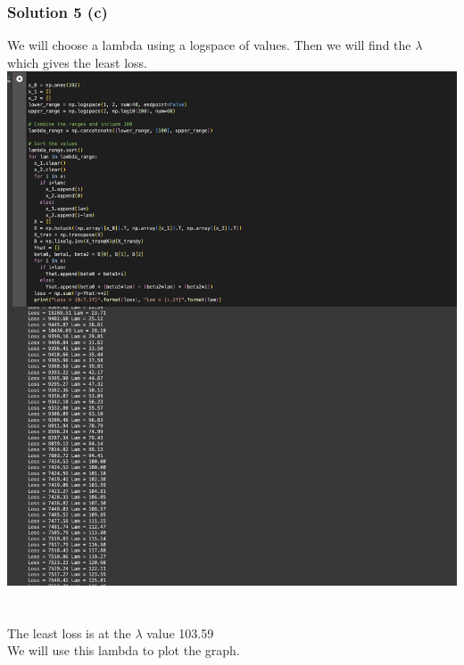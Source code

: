 \documentclass{assignment}
\begin{document}
\subsubsection*{Solution 5 (c)}
\noindent We will choose a lambda using a logspace of values. Then we will find the $\lambda$ which gives the least loss.
\includegraphics[scale=0.7]{Screenshot 2024-02-15 at 20.37.10.png}
\\ \\ \\ 
The least loss is at the $\lambda$ value 103.59\\ 
We will use this lambda to plot the graph.\\
\end{document}
